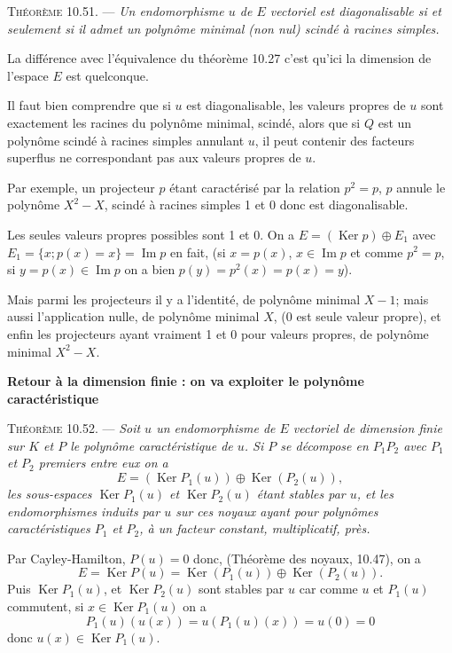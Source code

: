 \medskip\noindent\textsc{Théorème 10.51.} --- \emph{Un endomorphisme $u$ de $E$ vectoriel est diagonalisable si et seulement si il admet un polynôme minimal (non nul) scindé à racines simples.} \bookend

La différence avec l'équivalence du théorème 10.27 c'est qu'ici la dimension de l'espace $E$ est quelconque.

Il faut bien comprendre que si $u$ est diagonalisable, les valeurs propres de $u$ sont exactement les racines du polynôme minimal, scindé, alors que si $Q$ est un polynôme scindé à racines simples annulant $u$, il peut contenir des facteurs superflus ne correspondant pas aux valeurs propres de $u$.

Par exemple, un projecteur $p$ étant caractérisé par la relation $p^2=p$, $p$ annule le polynôme $X^2-X$, scindé à racines simples 1 et 0 donc est diagonalisable.

Les seules valeurs propres possibles sont 1 et 0. On a $E=(\operatorname{Ker}p)\oplus E_1$ avec $E_1=\{x;p(x)=x\}=\operatorname{Im}p$ en fait, (si $x=p(x)$, $x\in\operatorname{Im}p$ et comme $p^2=p$, si $y=p(x)\in\operatorname{Im}p$ on a bien $p(y)=p^2(x)=p(x)=y$).

Mais parmi les projecteurs il y a l'identité, de polynôme minimal $X-1$; mais aussi l'application nulle, de polynôme minimal $X$, (0 est seule valeur propre), et enfin les projecteurs ayant vraiment 1 et 0 pour valeurs propres, de polynôme minimal $X^2-X$.

\medskip\noindent\textbf{Retour à la dimension finie : on va exploiter le polynôme caractéristique}

\medskip\noindent\textsc{Théorème 10.52.} --- \emph{Soit $u$ un endomorphisme de $E$ vectoriel de dimension finie sur $K$ et $P$ le polynôme caractéristique de $u$. Si $P$ se décompose en $P_1P_2$ avec $P_1$ et $P_2$ premiers entre eux on a
\[
E=(\operatorname{Ker}P_1(u))\oplus\operatorname{Ker}(P_2(u)),
\]
les sous-espaces $\operatorname{Ker}P_1(u)$ et $\operatorname{Ker}P_2(u)$ étant stables par $u$, et les endomorphismes induits par $u$ sur ces noyaux ayant pour polynômes caractéristiques $P_1$ et $P_2$, à un facteur constant, multiplicatif, près.}

Par Cayley-Hamilton, $P(u)=0$ donc, (Théorème des noyaux, 10.47), on a
\[
E=\operatorname{Ker}P(u)=\operatorname{Ker}(P_1(u))\oplus\operatorname{Ker}(P_2(u)).
\]
Puis $\operatorname{Ker}P_1(u)$, et $\operatorname{Ker}P_2(u)$ sont stables par $u$ car comme $u$ et $P_1(u)$ commutent, si $x\in\operatorname{Ker}P_1(u)$ on a
\[
P_1(u)(u(x))=u(P_1(u)(x))=u(0)=0
\]
donc $u(x)\in\operatorname{Ker}P_1(u)$.

